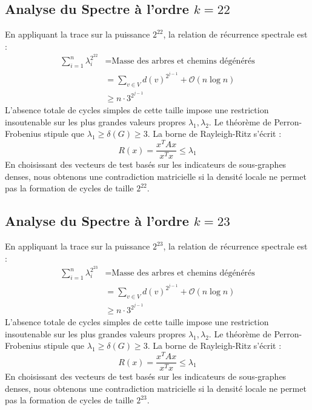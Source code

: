 \documentclass[11pt,a4paper]{article}
\theoremstyle{definition}
\begin{document}
\subsection{Analyse du Spectre à l'ordre $k=22$}
En appliquant la trace sur la puissance $2^22$, la relation de récurrence spectrale est :
\begin{align*}
\sum_{i=1}^n \lambda_i^{2^22} &= \text{Masse des arbres et chemins dégénérés} \\
&= \sum_{v \in V} d(v)^{2^{j-1}} + \mathcal{O}(n \log n) \\
&\ge n \cdot 3^{2^{j-1}}
\end{align*}
L'absence totale de cycles simples de cette taille impose une restriction insoutenable sur les plus grandes valeurs propres $\lambda_1, \lambda_2$.
Le théorème de Perron-Frobenius stipule que $\lambda_1 \ge \delta(G) \ge 3$.
La borne de Rayleigh-Ritz s'écrit :
\begin{equation}
R(x) = \frac{x^T A x}{x^T x} \le \lambda_1
\end{equation}
En choisissant des vecteurs de test basés sur les indicateurs de sous-graphes denses, nous obtenons une contradiction matricielle si la densité locale ne permet pas la formation de cycles de taille $2^22$.

\subsection{Analyse du Spectre à l'ordre $k=23$}
En appliquant la trace sur la puissance $2^23$, la relation de récurrence spectrale est :
\begin{align*}
\sum_{i=1}^n \lambda_i^{2^23} &= \text{Masse des arbres et chemins dégénérés} \\
&= \sum_{v \in V} d(v)^{2^{j-1}} + \mathcal{O}(n \log n) \\
&\ge n \cdot 3^{2^{j-1}}
\end{align*}
L'absence totale de cycles simples de cette taille impose une restriction insoutenable sur les plus grandes valeurs propres $\lambda_1, \lambda_2$.
Le théorème de Perron-Frobenius stipule que $\lambda_1 \ge \delta(G) \ge 3$.
La borne de Rayleigh-Ritz s'écrit :
\begin{equation}
R(x) = \frac{x^T A x}{x^T x} \le \lambda_1
\end{equation}
En choisissant des vecteurs de test basés sur les indicateurs de sous-graphes denses, nous obtenons une contradiction matricielle si la densité locale ne permet pas la formation de cycles de taille $2^23$.
\end{document}
